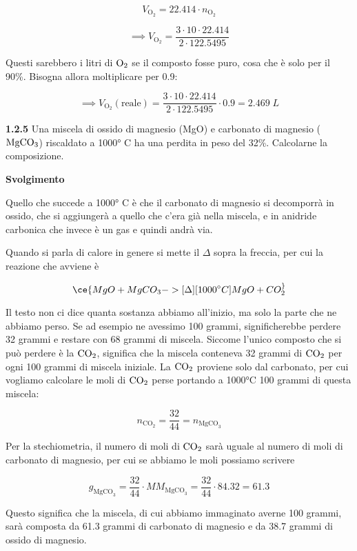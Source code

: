 $$V_{\text{O}_2}=22.414 \cdot n_{\text{O}_2}$$

$$\implies V_{\text{O}_2}=\frac{3 \cdot 10 \cdot 22.414}{2 \cdot 122.5495}$$

Questi sarebbero i litri di $\rm O_2$ se il composto fosse puro, cosa che è solo per il 90\%. Bisogna allora moltiplicare per 0.9:

$$\implies V_{\text{O}_2}(\text{reale})
=\frac{3 \cdot 10 \cdot 22.414}{2 \cdot 122.5495}\cdot 0.9=2.469\;L$$

\textbf{1.2.5} Una miscela di ossido di magnesio (MgO) e carbonato di magnesio ($\rm MgCO_3$) riscaldato a 1000° C ha una perdita in peso del 32\%. Calcolarne la composizione.

\vspace{0.2cm}\large\textbf{Svolgimento}\normalsize

\vspace{0.2cm}Quello che succede a 1000° C è che il carbonato di magnesio si decomporrà in ossido, che si aggiungerà a quello che c'era già nella miscela, e in anidride carbonica che invece è un gas e quindi andrà via.

Quando si parla di calore in genere si mette il $\Delta$ sopra la freccia, per cui la reazione che avviene è

$$\ce{MgO + MgCO_3 ->[{\Delta}][{1000^{\circ}C}] MgO + CO_2 ^}$$

Il testo non ci dice quanta sostanza abbiamo all'inizio, ma solo la parte che ne abbiamo perso. Se ad esempio ne avessimo 100 grammi, significherebbe perdere 32 grammi e restare con 68 grammi di miscela. Siccome l'unico composto che si può perdere è la $\rm CO_2$, significa che la miscela conteneva 32 grammi di $\rm CO_2$ per ogni 100 grammi di miscela iniziale. La $\rm CO_2$ proviene solo dal carbonato, per cui vogliamo calcolare le moli di $\rm CO_2$ perse portando a 1000°C 100 grammi di questa miscela:

$$n_{\text{CO}_2}=\frac{32}{44}=n_{\text{MgCO}_3}$$

Per la stechiometria, il numero di moli di $\rm CO_2$ sarà uguale al numero di moli di carbonato di magnesio, per cui se abbiamo le moli possiamo scrivere

$$g_{\text{MgCO}_3}=\frac{32}{44} \cdot MM_{\text{MgCO}_3}
=\frac{32}{44} \cdot 84.32=61.3$$

Questo significa che la miscela, di cui abbiamo immaginato averne 100 grammi, sarà composta da 61.3 grammi di carbonato di magnesio e da 38.7 grammi di ossido di magnesio.

